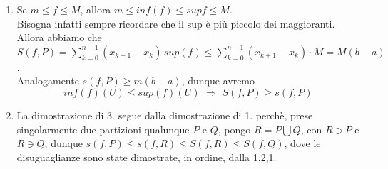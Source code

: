 \documentclass{article}
\theoremstyle{definition}
\newcommand{\cvd}{\begin{center} \textbf{\textit{\#}} \end{center}}
\begin{document}
\begin{enumerate}
Concludiamo la dimostrazione di 1. osservando che
\begin{equation*}
    =A+B+ (x_{k+1}-\xi) inf (f) + (\xi - x_k) inf (f) = s(f, P \bigcup \{\xi_1\})=s(f,P \bigcup \{\xi_1,\xi_2\}) \leqslant \underset{\mbox{itero}}{...} \leqslant s(f,Q)
\end{equation*}
\\
\cvd
\item Se $m \leqslant f \leqslant M$, allora $m \leqslant inf(f) \leqslant supf \leqslant M$.
\\
Bisogna infatti sempre ricordare che il sup è più piccolo dei maggioranti.
\\
Allora abbiamo che $S(f,P)= \sum_{k=0}^{n-1}(x_{k+1}-x_k)\, sup (f) \leqslant \sum_{k=0}^{n-1}(x_{k+1}-x_k) \cdot M= M (b-a)$.
\\
Analogamente $s(f,P) \geqslant m(b-a)$, dunque avremo
\begin{equation*}
    inf (f) (U) \leqslant sup(f)(U) \,\, \Longrightarrow \,\, S(f,P) \geqslant s(f,P)
\end{equation*}
\item La dimostrazione di 3. segue dalla dimostrazione di 1. perchè, prese singolarmente due partizioni qualunque $P$ e $Q$, pongo $R=P \bigcup Q$, con $R \owns P$ e $R \owns Q$, dunque $s(f,P) \leqslant s(f,R) \leqslant S(f,R) \leqslant S(f,Q)$, dove le disuguaglianze sono state dimostrate, in ordine, dalla 1,2,1.



\end{enumerate}
\end{document}
